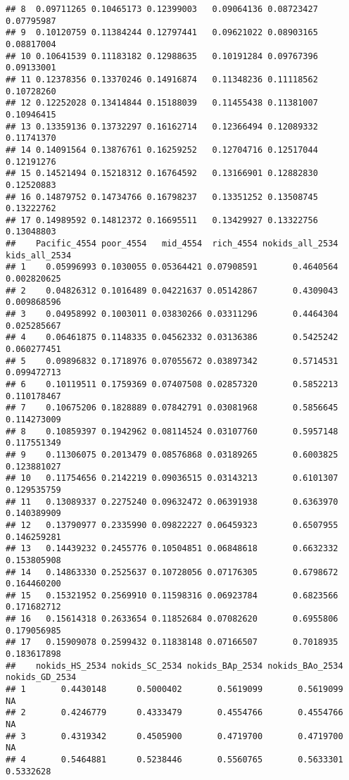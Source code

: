 \documentclass[
]{article}
\begin{document}
\begin{verbatim}
## 8  0.09711265 0.10465173 0.12399003   0.09064136 0.08723427    0.07795987
## 9  0.10120759 0.11384244 0.12797441   0.09621022 0.08903165    0.08817004
## 10 0.10641539 0.11183182 0.12988635   0.10191284 0.09767396    0.09133001
## 11 0.12378356 0.13370246 0.14916874   0.11348236 0.11118562    0.10728260
## 12 0.12252028 0.13414844 0.15188039   0.11455438 0.11381007    0.10946415
## 13 0.13359136 0.13732297 0.16162714   0.12366494 0.12089332    0.11741370
## 14 0.14091564 0.13876761 0.16259252   0.12704716 0.12517044    0.12191276
## 15 0.14521494 0.15218312 0.16764592   0.13166901 0.12882830    0.12520883
## 16 0.14879752 0.14734766 0.16798237   0.13351252 0.13508745    0.13222762
## 17 0.14989592 0.14812372 0.16695511   0.13429927 0.13322756    0.13048803
##    Pacific_4554 poor_4554   mid_4554  rich_4554 nokids_all_2534 kids_all_2534
## 1    0.05996993 0.1030055 0.05364421 0.07908591       0.4640564   0.002820625
## 2    0.04826312 0.1016489 0.04221637 0.05142867       0.4309043   0.009868596
## 3    0.04958992 0.1003011 0.03830266 0.03311296       0.4464304   0.025285667
## 4    0.06461875 0.1148335 0.04562332 0.03136386       0.5425242   0.060277451
## 5    0.09896832 0.1718976 0.07055672 0.03897342       0.5714531   0.099472713
## 6    0.10119511 0.1759369 0.07407508 0.02857320       0.5852213   0.110178467
## 7    0.10675206 0.1828889 0.07842791 0.03081968       0.5856645   0.114273009
## 8    0.10859397 0.1942962 0.08114524 0.03107760       0.5957148   0.117551349
## 9    0.11306075 0.2013479 0.08576868 0.03189265       0.6003825   0.123881027
## 10   0.11754656 0.2142219 0.09036515 0.03143213       0.6101307   0.129535759
## 11   0.13089337 0.2275240 0.09632472 0.06391938       0.6363970   0.140389909
## 12   0.13790977 0.2335990 0.09822227 0.06459323       0.6507955   0.146259281
## 13   0.14439232 0.2455776 0.10504851 0.06848618       0.6632332   0.153805908
## 14   0.14863330 0.2525637 0.10728056 0.07176305       0.6798672   0.164460200
## 15   0.15321952 0.2569910 0.11598316 0.06923784       0.6823566   0.171682712
## 16   0.15614318 0.2633654 0.11852684 0.07082620       0.6955806   0.179056985
## 17   0.15909078 0.2599432 0.11838148 0.07166507       0.7018935   0.183617898
##    nokids_HS_2534 nokids_SC_2534 nokids_BAp_2534 nokids_BAo_2534 nokids_GD_2534
## 1       0.4430148      0.5000402       0.5619099       0.5619099             NA
## 2       0.4246779      0.4333479       0.4554766       0.4554766             NA
## 3       0.4319342      0.4505900       0.4719700       0.4719700             NA
## 4       0.5464881      0.5238446       0.5560765       0.5633301      0.5332628

\end{verbatim}
\end{document}
